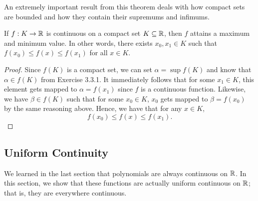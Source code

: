 An extremely important result from this theorem deals with how compact sets are bounded and how they contain their supremums and infimums.




\begin{theorem}
    If \( f: K \to \mathbb{R}  \) is continuous on a compact set \( K \subseteq \mathbb{R}  \), then \( f  \) attains a maximum and minimum value. In other words, there exists \( x_0, x_1 \in K  \) such that \( f(x_0) \leq f(x) \leq f(x_1) \) for all \( x \in K  \).
    \end{theorem}

\begin{proof}
    Since \( f(K) \) is a compact set, we can set \( \alpha = \sup f(K) \) and know that \( \alpha \in f(K) \) from Exercise 3.3.1. It immediately follows that for some \( x_1 \in K  \), this element gets mapped to \( \alpha = f(x_1) \) since \( f  \) is a continuous function. Likewise, we have \( \beta \in f(K) \) such that for some \( x_0 \in K  \), \( x_0  \) gets mapped to \( \beta = f(x_0 ) \) by the same reasoning above. Hence, we have that for any \( x \in K  \), 
    \[  f(x_0) \leq f(x) \leq f(x_1). \]
\end{proof}

\subsection{Uniform Continuity}

We learned in the last section that polynomials are always continuous on \( \mathbb{R}  \). In this section, we show that these functions are actually uniform continuous on \( \mathbb{R}  \); that is, they are everywhere continuous.

